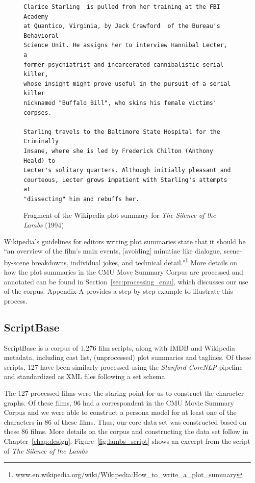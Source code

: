 \documentclass[bsc,frontabs,deptreport,singlespacing,parskip, twoside]{infthesis}
\begin{document}
\begin{figure}[h!]
\centering
\begin{minipage}{14.5cm}
\begin{Verbatim}[frame=single]
Clarice Starling  is pulled from her training at the FBI Academy 
at Quantico, Virginia, by Jack Crawford  of the Bureau's Behavioral
Science Unit. He assigns her to interview Hannibal Lecter, a 
former psychiatrist and incarcerated cannibalistic serial killer, 
whose insight might prove useful in the pursuit of a serial killer
nicknamed "Buffalo Bill", who skins his female victims' corpses.

Starling travels to the Baltimore State Hospital for the Criminally 
Insane, where she is led by Frederick Chilton (Anthony Heald) to 
Lecter's solitary quarters. Although initially pleasant and 
courteous, Lecter grows impatient with Starling's attempts at 
"dissecting" him and rebuffs her.
\end{Verbatim}
\end{minipage}
\caption{Fragment of the Wikipedia plot summary for \textit{The Silence of the Lambs} (1994)}
\label{fig:lambs_summary}
\end{figure}


Wikipedia's guidelines for editors writing plot summaries state that it should be ``an overview of the film's main events, [avoiding] minutiae like dialogue, scene-by-scene breakdowns, individual jokes, and technical detail."\footnote{www.en.wikipedia.org/wiki/Wikipedia:How\_to\_write\_a\_plot\_summary} More details on how the plot summaries in the CMU Move Summary Corpus are processed and annotated can be found in Section~\ref{sec:processing_cmu}, which discusses our use of the corpus. Appendix A provides a step-by-step example to illustrate this process.


\subsection{ScriptBase}
ScriptBase \cite{Gorinski2015} is a corpus of 1,276 film scripts, along with IMDB and Wikipedia metadata, including cast list, (unprocessed) plot summaries and taglines. Of these scripts, 127 have been similarly processed using the \textit{Stanford CoreNLP} pipeline and standardized as XML files following a set schema.

The 127 processed films were the staring point for us to construct the character graphs. Of these films, 96 had a correspondent in the CMU Movie Summary Corpus and we were able to construct a persona model for at least one of the characters in 86 of these films. Thus, our core data set was constructed based on these 86 films. More details on the corpus and constructing the data set follow in Chapter~\ref{chap:design}. Figure~\ref{fig:lambs_script} shows an excerpt from the script of \textit{The Silence of the Lambs}
\end{document}
